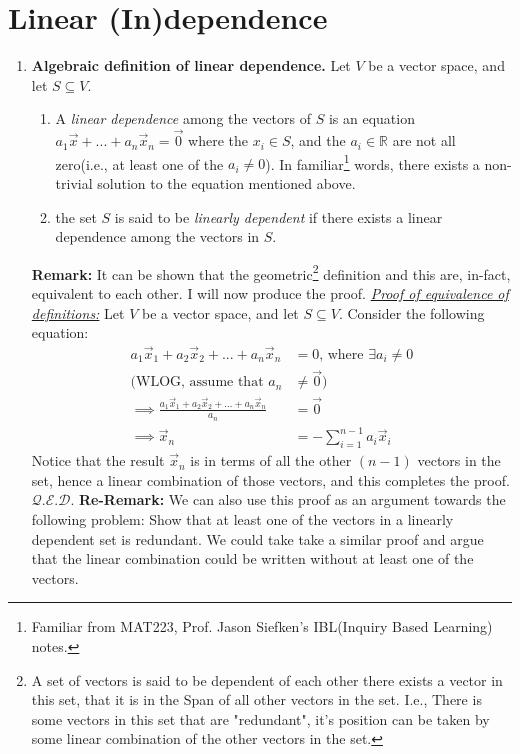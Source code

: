 \documentclass[oneside, 12pt]{book}
\newcommand{\settag}[1]{\renewcommand{\theenumi}{#1}}
\newcommand{\R}{\mathbb{R}}
\newcommand{\qed}{\hfill $\mathcal{Q}.\mathcal{E}.\mathcal{D}.$}
\newcommand{\tbf}[1]{\textbf{#1}}
\newcommand{\tit}[1]{\textit{#1}}
\begin{document}
\section{Linear (In)dependence}
    \begin{enumerate}
        \settag{1.4.2}
        \item \textbf{Algebraic definition of linear dependence.} Let $V$ be a vector space, and let $S\subseteq V$.
            \begin{enumerate}
                \item A \textit{linear dependence} among the vectors of $S$ is an equation $a_1\vec{x} + ... + a_n\vec{x}_n = \vec{0}$ where the $x_i\in S$, and the $a_i\in \R$ are not all zero(i.e., at least one of the $a_i\neq 0$). In familiar\footnote{Familiar from MAT223, Prof. Jason Siefken's IBL(Inquiry Based Learning) notes.} words, there exists a non-trivial solution to the equation mentioned above.
                \item the set $S$ is said to be \textit{linearly dependent} if there exists a linear dependence among the vectors in $S$.
            \end{enumerate}
            \tbf{Remark: }It can be shown that the geometric\footnote{A set of vectors is said to be dependent of each other there exists a vector in this set, that it is in the Span of all other vectors in the set. I.e., There is some vectors in this set that are "redundant", it's position can be taken by some linear combination of the other vectors in the set.} definition and this are, in-fact, equivalent to each other. I will now produce the proof. \newline
        \tit{\underline{Proof of equivalence of definitions:}} \newline
        Let $V$ be a vector space, and let $S\subseteq V$. Consider the following equation:
        \begin{align*}
            a_1\vec{x}_1 + a_2\vec{x}_2 + ... + a_n\vec{x}_n &= 0\text{, where } \exists a_i\neq 0 \\
            \text{(WLOG, assume that } a_n &\neq \vec{0}\text{)}\\
            \implies \frac{a_1\vec{x}_1 + a_2\vec{x}_2 + ... + a_n\vec{x}_n}{a_n}&=\vec{0}\\
            \implies \vec{x}_n &= -\sum_{i=1}^{n-1}a_i\vec{x}_i
        \end{align*}
        Notice that the result $\vec{x}_n$ is in terms of all the other $(n-1)$ vectors in the set, hence a linear combination of those vectors, and this completes the proof.
        \qed\newline
        \textbf{Re-Remark: }We can also use this proof as an argument towards the following problem: Show that at least one of the vectors in a linearly dependent set is redundant. We could take take a similar proof and argue that the linear combination could be written without at least one of the vectors.
        

\end{enumerate}
\end{document}
